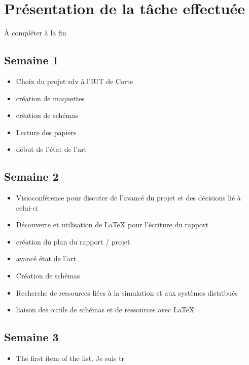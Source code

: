 \documentclass{rapport_stage}
\begin{document}
\cleardoublepage

\chapter{Présentation de la tâche effectuée}

 {\color{green}
  À compléter à la fin
 }

\section*{Semaine 1}

\begin{itemize}[label=$\bullet$]
  \item Choix du projet rdv à l'IUT de Corte
  \item création de maquettes
  \item création de schémas
  \item Lecture des papiers
  \item début de l'état de l'art
\end{itemize}

\section*{Semaine 2}

\begin{itemize}[label=$\bullet$]
  \item Visioconférence pour discuter de l'avancé du projet et des décisions lié à celui-ci
  \item Découverte et utilisation de LaTeX pour l'écriture du rapport
  \item création du plan du rapport / projet
  \item avancé état de l'art
  \item Création de schémas
  \item Recherche de ressources liées à la simulation et aux systèmes distribués
  \item liaison des outils de schémas et de ressources avec LaTeX
\end{itemize}

\section*{Semaine 3}

\begin{itemize}[label=$\bullet$]
  \item The first item of the list. Je suis tr
\end{itemize}
\end{document}
